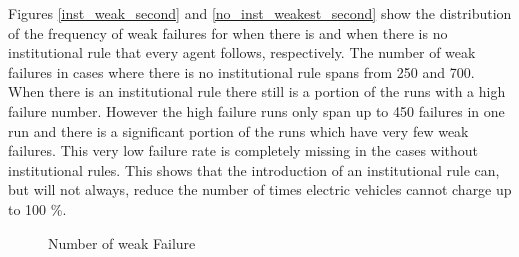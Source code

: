 \documentclass[a4paper]{article}
\begin{document}
\newpage
Figures \ref{inst_weak_second} and \ref{no_inst_weakest_second}  show the distribution of the frequency of weak failures  for 
when there is and when there is no institutional rule that every agent follows, respectively. The number of weak failures in cases
where there is no institutional  rule spans from 250 and 700. When there is an institutional rule there still is a portion of the 
runs with a high failure number. However the high failure runs only span up to 450 failures in one run and there is a significant 
portion of the runs which have very few weak failures. This very low failure rate is completely missing in the cases without 
institutional rules. This shows that the introduction of an institutional rule can, but will not always, reduce the number of times
electric vehicles cannot charge up to 100 \%. \\
\begin{figure}[!ht]
\caption{Number of weak Failure}
\label{weakest_second}
\end{figure} \\
\end{document}
